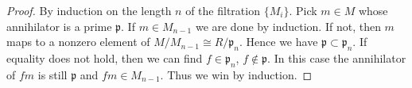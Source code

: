 \documentclass[10pt,a4paper]{amsart}
\theoremstyle{plain}
\theoremstyle{definition}
\theoremstyle{remark}
\numberwithin{equation}{subsection}
\begin{document}
\begin{proof}
By induction on the length $n$ of the filtration $\{ M_i \}$.
Pick $m \in M$ whose annihilator is a prime $\mathfrak p$.
If $m \in M_{n-1}$ we are done by induction. If not,
then $m$ maps to a nonzero element of $M/M_{n-1} \cong
R/\mathfrak p_n$. Hence we have $\mathfrak p \subset \mathfrak p_n$.
If equality does not hold, then we can find $f \in \mathfrak p_n$,
$f \not\in \mathfrak p$. In this case the annihilator of $fm$ is still
$\mathfrak p$ and $fm \in M_{n-1}$. Thus we win by induction.
\end{proof}
\end{document}
